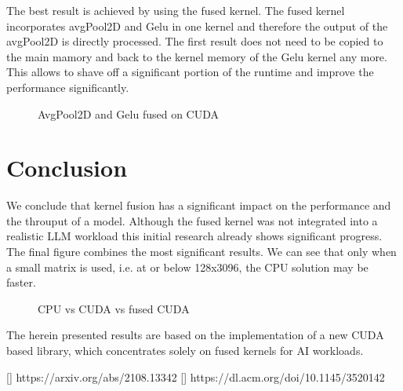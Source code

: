 \documentclass[letterpaper]{article}
\begin{document}
The best result is achieved by using the fused kernel. The fused kernel incorporates avgPool2D and Gelu in one kernel and therefore the output of the avgPool2D is directly processed. The first result does not need to be copied to the main mamory and back to the kernel memory of the Gelu kernel any more. This allows to shave off a significant portion of the runtime and improve the performance significantly. 

\begin{figure}

\caption{AvgPool2D and Gelu fused on CUDA}
\label{cudaAvgPoolGeluFused}
\end{figure}




\section{Conclusion}



We conclude that kernel fusion has a significant impact on the performance and the throuput of a model. Although the fused kernel was not integrated into a realistic LLM workload this initial research already shows significant progress. The final figure combines the most significant results. We can see that only when a small matrix is used, i.e. at or below 128x3096, the CPU solution may be faster. 

\begin{figure}
\caption{CPU vs CUDA vs fused CUDA}
\label{cudaGelu}
\end{figure}


The herein presented results are based on the implementation of a new CUDA based library, which concentrates solely on fused kernels for AI workloads. 

[] https://arxiv.org/abs/2108.13342
[] https://dl.acm.org/doi/10.1145/3520142
\end{document}
